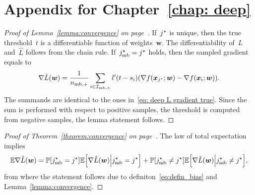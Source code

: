 \chapter{Appendix for Chapter~\ref{chap: deep}}

\lemmacovergencedeep*
\begin{proof}[Proof of Lemma~\ref{lemma:convergence} on page~\pageref{lemma:convergence}]
  If~$j^{\star}$ is unique, then the true threshold~$t$ is a differentiable function of weights~$\bm{w}$. The differentiability of~$L$ and~$\hat L$ follows from the chain rule. If~$j^{\star}_{\text{mb}} = j^{\star}$ holds, then the sampled gradient equals to
  \begin{equation}\label{eq:grad_min_aux}
    \nabla \hat L(\bm{w})
      = \frac{1}{\nmbpos} \sum_{i\in \Imbpos} l'(t - s_i) \Brac{\nabla f(\bm{x}_{\indmax}; \bm{w}) - \nabla f(\bm{x}_i; \bm{w})}.
  \end{equation}
  The summands are identical to the ones in~\eqref{eq: deep L gradient true}. Since the sum is performed with respect to positive samples, the threshold is computed from negative samples, the lemma statement follows.
\end{proof}

\thmcovergencedeep*
\begin{proof}[Proof of Theorem~\ref{theorem:convergence} on page~\pageref{theorem:convergence}]
  The law of total expectation implies
  \begin{equation*}
    \EE \nabla \hat L(\bm{w})
      = \PP \Brac[s]{\indmaxmb = \indmax} \EE \Brac[s]{\nabla \hat L(\bm{w}) \middle\vert \indmaxmb =\indmax}
      + \PP \Brac[s]{\indmaxmb \neq \indmax} \EE \Brac[s]{\nabla \hat L(\bm{w}) \middle\vert\indmaxmb\neq \indmax},
  \end{equation*}
  from where the statement follows due to definiton~\eqref{eq:defin_bias} and Lemma~\ref{lemma:convergence}.
\end{proof}